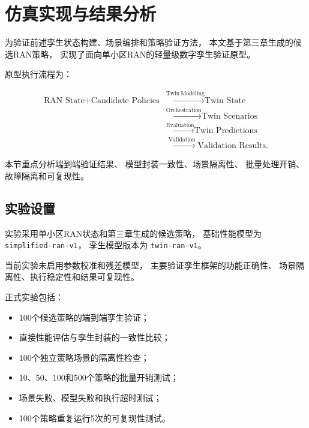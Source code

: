 \documentclass[lang=cn,12pt]{elegantbook}
\begin{document}
\section{仿真实现与结果分析}
\label{sec:twin_simulation_results}

为验证前述孪生状态构建、场景编排和策略验证方法，
本文基于第三章生成的候选RAN策略，
实现了面向单小区RAN的轻量级数字孪生验证原型。

原型执行流程为：

\begin{equation}
\begin{aligned}
\text{RAN State}
+
\text{Candidate Policies}
&\xrightarrow{\mathrm{Twin\ Modeling}}
\text{Twin State}
\\
&\xrightarrow{\mathrm{Orchestration}}
\text{Twin Scenarios}
\\
&\xrightarrow{\mathrm{Evaluation}}
\text{Twin Predictions}
\\
&\xrightarrow{\mathrm{Validation}}
\text{Validation Results}.
\end{aligned}
\label{eq:twin_formal_experiment_pipeline}
\end{equation}

本节重点分析端到端验证结果、
模型封装一致性、场景隔离性、
批量处理开销、故障隔离和可复现性。


\subsection*{实验设置}

实验采用单小区RAN状态和第三章生成的候选策略，
基础性能模型为
\texttt{simplified-ran-v1}，
孪生模型版本为
\texttt{twin-ran-v1}。

当前实验未启用参数校准和残差模型，
主要验证孪生框架的功能正确性、
场景隔离性、执行稳定性和结果可复现性。

正式实验包括：

\begin{itemize}
    \item 100个候选策略的端到端孪生验证；
    \item 直接性能评估与孪生封装的一致性比较；
    \item 100个独立策略场景的隔离性检查；
    \item 10、50、100和500个策略的批量开销测试；
    \item 场景失败、模型失败和执行超时测试；
    \item 100个策略重复运行5次的可复现性测试。
\end{itemize}
\end{document}
